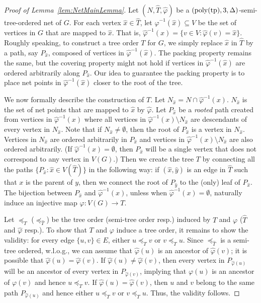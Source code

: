 \documentclass{theoretics}
\newcommand{\tp}{{\rm tp}}
\newcommand{\poly}{\mathrm{poly}}
\begin{document}
\begin{proof}[Proof of Lemma~\ref{lem:NetMainLemma}] Let $(N,\hat{T},\hat{\varphi})$ be a $(\poly(\tp),3,\Delta)$-semi-tree-ordered net of $G$. For each vertex $\hat{x}\in \hat{T}$, let $\hat{\varphi}^{-1}(\hat{x})\subseteq V$ be the set of vertices in $G$ that are mapped to $\hat{x}$.  That is,  $\hat{\varphi}^{-1}(x) = \{v\in V: \hat{\varphi}(v) = \hat{x}\}$. Roughly speaking, to construct a tree order $T$ for $G$,  we simply replace $\hat{x}$ in $\hat{T}$ by a path, say $P_{\hat{x}}$, composed of vertices in  $\hat{\varphi}^{-1}(\hat{x})$. The packing property remains the same, but the covering property might not hold if vertices in  $\hat{\varphi}^{-1}(\hat{x})$ are ordered arbitrarily along $P_{\hat{x}}$. Our idea to guarantee the packing property is to place net points in $\hat{\varphi}^{-1}(\hat{x})$ closer to the root of the tree.


We now formally describe the construction of $T$. Let $N_{\hat{x}} = N\cap \hat{\varphi}^{-1}(x)$. $N_{\hat{x}}$ is the set of net points that are mapped to $\hat{x}$ by $\hat{\varphi}$. Let $P_{\hat{x}}$ be a \emph{rooted} path created from vertices in $\hat{\varphi}^{-1}(x)$ where all vertices in   $\hat{\varphi}^{-1}(x)\setminus N_{\hat{x}}$ are descendants of every vertex in $N_{\hat{x}}$. Note that if $N_{\hat{x}}\not=\emptyset$, then the root of $P_{\hat{x}}$ is a vertex in $N_{\hat{x}}$. Vertices in $N_{\hat{x}}$ are ordered arbitrarily in  $P_{\hat{x}}$ and vertices in $\hat{\varphi}^{-1}(x)\setminus N_{\hat{x}}$ are also ordered arbitrarily. (If $\hat{\varphi}^{-1}(x) = \emptyset$, then $P_{\hat{x}}$ will be a single vertex that does not correspond to any vertex in $V(G)$.) Then we create the tree $T$ by connecting all the paths $\{P_{\hat{x}}: \hat{x} \in V(\hat{T})\}$ in the following way: if $(\hat{x},\hat{y})$ is an edge in $\hat{T}$ such that $x$ is the parent of $y$, then we connect the root of $P_{\hat{y}}$ to the (only) leaf of $P_{\hat{x}}$. The bijection between $P_{\hat{x}}$ and $\hat{\varphi}^{-1}(x)$, unless when $\hat{\varphi}^{-1}(x) = \emptyset$, naturally induce an injective map $\varphi:V(G)\rightarrow T$. 

Let $\preceq_T$ ($\preceq_{\hat{T}}$)  be the tree order (semi-tree order resp.) induced by  $T$ and $\varphi$ ($\hat{T}$ and $\hat{\varphi}$ resp.). To show that $T$ and $\varphi$ induce a tree order, it remains to show the validity: for every edge $\{u,v\} \in E$, either $u \preceq_T v$  or $v\preceq_T u$. Since $\preceq_{\hat{T}}$  is a semi-tree ordered, w.l.o.g., we can assume that $\hat{\varphi}(u)$ is an ancestor of $\hat{\varphi}(v)$; it is possible that $\hat{\varphi}(u) = \hat{\varphi}(v)$.  If $\hat{\varphi}(u) \not=\hat{\varphi}(v)$, then every vertex in $P_{\hat{\varphi}(u)}$ will be an ancestor of every vertex in $P_{\hat{\varphi}(v)}$, implying that $\varphi(u)$ is an ancestor of $\varphi(v)$ and hence  $u \preceq_T v$. If $\hat{\varphi}(u) =\hat{\varphi}(v)$, then $u$ and $v$ belong to the same path $P_{\hat{\varphi}(u)}$ and hence either $u \preceq_T v$ or $v \preceq_T u$. Thus, the validity follows. 


\end{proof}
\end{document}
